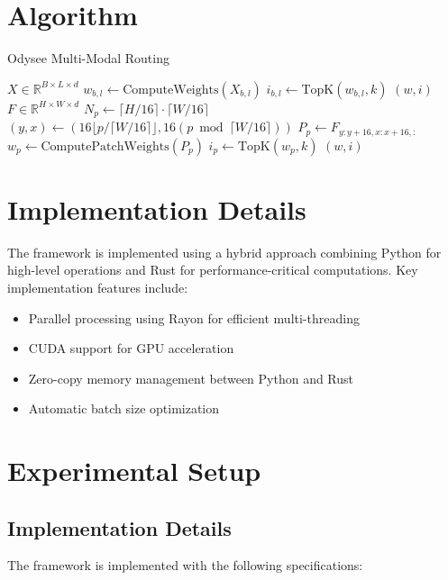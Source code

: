 \documentclass[10pt,journal,compsoc]{IEEEtran}
\begin{document}
\section{Algorithm}
\begin{algorithm}
\caption{Odysee Multi-Modal Routing}
\begin{algorithmic}[1]
    \State $X \in \mathbb{R}^{B \times L \times d}$ 
            \State $w_{b,l} \gets \text{ComputeWeights}(X_{b,l})$
            \State $i_{b,l} \gets \text{TopK}(w_{b,l}, k)$
        \EndFor
    \EndFor
    \Return $(w, i)$
\EndProcedure
{}
    \State $F \in \mathbb{R}^{H \times W \times d}$ 
    \State $N_p \gets \lceil H/16 \rceil \cdot \lceil W/16 \rceil$
        \State $(y, x) \gets (16\lfloor p/\lceil W/16 \rceil\rfloor, 16(p \bmod \lceil W/16 \rceil))$
        \State $P_p \gets F_{y:y+16, x:x+16, :}$ 
        \State $w_p \gets \text{ComputePatchWeights}(P_p)$
        \State $i_p \gets \text{TopK}(w_p, k)$
    \EndFor
    \Return $(w, i)$
\EndProcedure
\end{algorithmic}
\end{algorithm}

\section{Implementation Details}
The framework is implemented using a hybrid approach combining Python for high-level operations and Rust for performance-critical computations. Key implementation features include:

\begin{itemize}
    \item Parallel processing using Rayon for efficient multi-threading
    \item CUDA support for GPU acceleration
    \item Zero-copy memory management between Python and Rust
    \item Automatic batch size optimization
\end{itemize}

\section{Experimental Setup}

\subsection{Implementation Details}
The framework is implemented with the following specifications:
\end{document}
